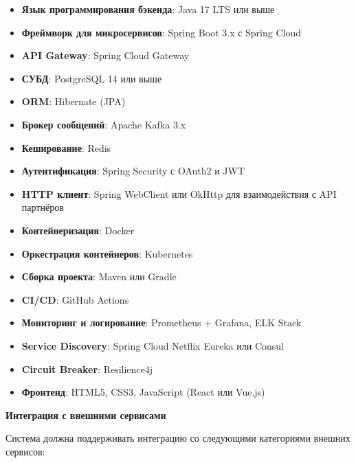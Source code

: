 \documentclass{bmstu}
\begin{document}
\begin{itemize}
    \item \textbf{Язык программирования бэкенда}: Java 17 LTS или выше
    \item \textbf{Фреймворк для микросервисов}: Spring Boot 3.x с Spring Cloud
    \item \textbf{API Gateway}: Spring Cloud Gateway
    \item \textbf{СУБД}: PostgreSQL 14 или выше
    \item \textbf{ORM}: Hibernate (JPA)
    \item \textbf{Брокер сообщений}: Apache Kafka 3.x
    \item \textbf{Кеширование}: Redis
    \item \textbf{Аутентификация}: Spring Security с OAuth2 и JWT
    \item \textbf{HTTP клиент}: Spring WebClient или OkHttp для взаимодействия с API партнёров
    \item \textbf{Контейнеризация}: Docker
    \item \textbf{Оркестрация контейнеров}: Kubernetes
    \item \textbf{Сборка проекта}: Maven или Gradle
    \item \textbf{CI/CD}: GitHub Actions
    \item \textbf{Мониторинг и логирование}: Prometheus + Grafana, ELK Stack
    \item \textbf{Service Discovery}: Spring Cloud Netflix Eureka или Consul
    \item \textbf{Circuit Breaker}: Resilience4j
    \item \textbf{Фронтенд}: HTML5, CSS3, JavaScript (React или Vue.js)
\end{itemize}

\begin{center}
    \textbf{Интеграция с внешними сервисами}
\end{center}

Система должна поддерживать интеграцию со следующими категориями внешних сервисов:
\end{document}
